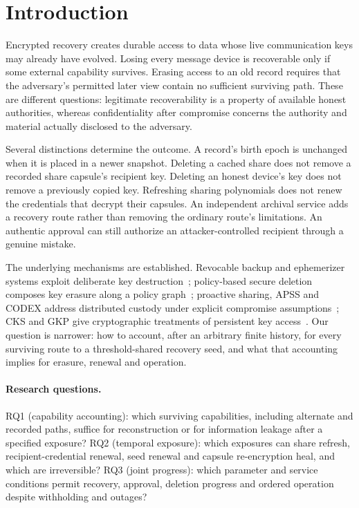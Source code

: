 \documentclass[pdflatex,sn-mathphys-num]{sn-jnl}
\theoremstyle{plain}
\theoremstyle{definition}
\begin{document}
\section{Introduction}\label{sec:intro}

Encrypted recovery creates durable access to data whose live communication keys may already have evolved. Losing every message device is recoverable only if some external capability survives. Erasing access to an old record requires that the adversary's permitted later view contain no sufficient surviving path. These are different questions: legitimate recoverability is a property of available honest authorities, whereas confidentiality after compromise concerns the authority and material actually disclosed to the adversary.

Several distinctions determine the outcome. A record's birth epoch is unchanged when it is placed in a newer snapshot. Deleting a cached share does not remove a recorded share capsule's recipient key. Deleting an honest device's key does not remove a previously copied key. Refreshing sharing polynomials does not renew the credentials that decrypt their capsules. An independent archival service adds a recovery route rather than removing the ordinary route's limitations. An authentic approval can still authorize an attacker-controlled recipient through a genuine mistake.

The underlying mechanisms are established. Revocable backup and ephemerizer systems exploit deliberate key destruction~\cite{boneh1996,perlman2007}; policy-based secure deletion composes key erasure along a policy graph~\cite{cachin2013}; proactive sharing, APSS and CODEX address distributed custody under explicit compromise assumptions~\cite{ostrovsky1991,herzberg1995,zhou2005,marsh2004}; CKS and GKP give cryptographic treatments of persistent key access~\cite{dodis2024,dodisstandard2024,backendal2026}. Our question is narrower: how to account, after an arbitrary finite history, for every surviving route to a threshold-shared recovery seed, and what that accounting implies for erasure, renewal and operation.

\paragraph{Research questions.}
RQ1 (capability accounting): which surviving capabilities, including alternate and recorded paths, suffice for reconstruction or for information leakage after a specified exposure? RQ2 (temporal exposure): which exposures can share refresh, recipient-credential renewal, seed renewal and capsule re-encryption heal, and which are irreversible? RQ3 (joint progress): which parameter and service conditions permit recovery, approval, deletion progress and ordered operation despite withholding and outages?
\end{document}
